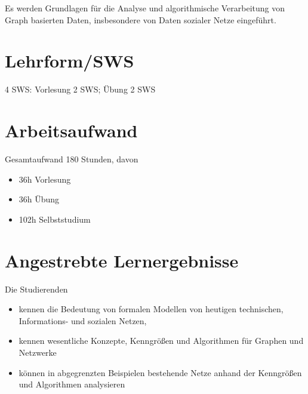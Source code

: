 Es werden Grundlagen für die Analyse und algorithmische Verarbeitung von
Graph basierten Daten, insbesondere von Daten sozialer Netze eingeführt.

\section*{Lehrform/SWS\label{/mi-2017/modulbeschreibungen-master/MA_SC_Modul_Netzwerk--und-Graphentheorie}}\label{lehrformswspathlabelmi-2017modulbeschreibungen-mastermaux5fscux5fmodulux5fnetzwerkund-graphentheorie}

4 SWS: Vorlesung 2 SWS; Übung 2 SWS

\section*{Arbeitsaufwand\label{/mi-2017/modulbeschreibungen-master/MA_SC_Modul_Netzwerk--und-Graphentheorie}}\label{arbeitsaufwandpathlabelmi-2017modulbeschreibungen-mastermaux5fscux5fmodulux5fnetzwerkund-graphentheorie}

Gesamtaufwand 180 Stunden, davon

\begin{itemize}
\tightlist
\item
  36h Vorlesung
\item
  36h Übung
\item
  102h Selbststudium
\end{itemize}

\section*{Angestrebte
Lernergebnisse\label{/mi-2017/modulbeschreibungen-master/MA_SC_Modul_Netzwerk--und-Graphentheorie}}\label{angestrebte-lernergebnissepathlabelmi-2017modulbeschreibungen-mastermaux5fscux5fmodulux5fnetzwerkund-graphentheorie}

Die Studierenden

\begin{itemize}
\tightlist
\item
  kennen die Bedeutung von formalen Modellen von heutigen technischen,
  Informations- und sozialen Netzen,
\item
  kennen wesentliche Konzepte, Kenngrößen und Algorithmen für Graphen
  und Netzwerke
\item
  können in abgegrenzten Beispielen bestehende Netze anhand der
  Kenngrößen und Algorithmen analysieren
\end{itemize}

